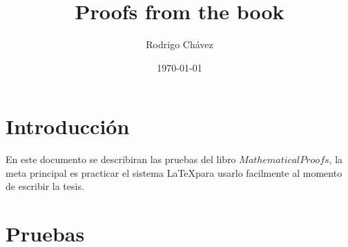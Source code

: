 \documentclass[11pt,a4paper]{article}
\title{Proofs from the book}
\date{\today}
\author{Rodrigo Chávez}
\begin{document}
\maketitle
\section{Introducción}
En este documento se describiran las pruebas del libro $Mathematical Proofs$, la meta principal es practicar el sistema \LaTeX para usarlo facilmente al momento de escribir la tesis.
\section{Pruebas}
\end{document}

